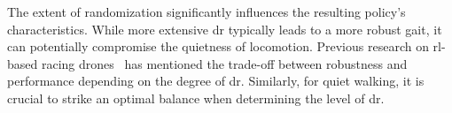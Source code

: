 The extent of randomization significantly influences the resulting policy's characteristics. While more extensive \ac{dr} typically leads to a more robust gait, it can potentially compromise the quietness of locomotion. Previous research on \ac{rl}-based racing drones~\cite{song2023reaching} has mentioned the trade-off between robustness and performance depending on the degree of \ac{dr}. Similarly, for quiet walking, it is crucial to strike an optimal balance when determining the level of \ac{dr}.


